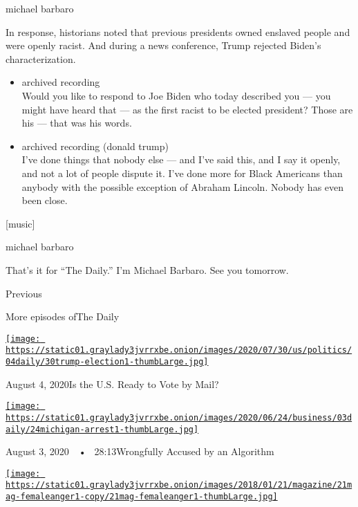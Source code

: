 michael barbaro

In response, historians noted that previous presidents owned enslaved
people and were openly racist. And during a news conference, Trump
rejected Biden's characterization.

\begin{itemize}
\item
  archived recording\\
  Would you like to respond to Joe Biden who today described you --- you
  might have heard that --- as the first racist to be elected president?
  Those are his --- that was his words.
\item
  archived recording (donald trump)\\
  I've done things that nobody else --- and I've said this, and I say it
  openly, and not a lot of people dispute it. I've done more for Black
  Americans than anybody with the possible exception of Abraham Lincoln.
  Nobody has even been close.
\end{itemize}

{[}music{]}

michael barbaro

That's it for ``The Daily.'' I'm Michael Barbaro. See you tomorrow.

Previous

More episodes ofThe Daily

\href{https://www.nytimes3xbfgragh.onion/2020/08/04/podcasts/the-daily/mail-in-voting-president-trump.html?action=click\&module=audio-series-bar\&region=header\&pgtype=Article}{\texttt{[image: https://static01.graylady3jvrrxbe.onion/images/2020/07/30/us/politics/04daily/30trump-election1-thumbLarge.jpg]}}

August 4, 2020Is the U.S. Ready to Vote by Mail?

\href{https://www.nytimes3xbfgragh.onion/2020/08/03/podcasts/the-daily/algorithmic-justice-racism.html?action=click\&module=audio-series-bar\&region=header\&pgtype=Article}{\texttt{[image: https://static01.graylady3jvrrxbe.onion/images/2020/06/24/business/03daily/24michigan-arrest1-thumbLarge.jpg]}}

August 3, 2020~~•~ 28:13Wrongfully Accused by an Algorithm

\href{https://www.nytimes3xbfgragh.onion/2020/08/02/podcasts/the-daily/on-female-rage.html?action=click\&module=audio-series-bar\&region=header\&pgtype=Article}{\texttt{[image: https://static01.graylady3jvrrxbe.onion/images/2018/01/21/magazine/21mag-femaleanger1-copy/21mag-femaleanger1-thumbLarge.jpg]}}

